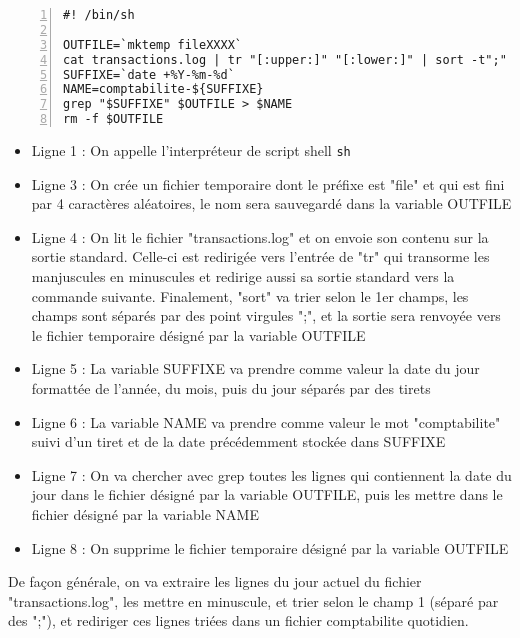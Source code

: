 \documentclass[11pt,a4paper]{article}
\begin{document}
\bigskip

\lstset{language=sh}
\begin{lstlisting}[frame=single,numbers=left,title={script.sh}]
#! /bin/sh

OUTFILE=`mktemp fileXXXX`
cat transactions.log | tr "[:upper:]" "[:lower:]" | sort -t";" -k1 -o $OUTFILE
SUFFIXE=`date +%Y-%m-%d`
NAME=comptabilite-${SUFFIXE}
grep "$SUFFIXE" $OUTFILE > $NAME
rm -f $OUTFILE

\end{lstlisting}

\bigskip

\begin{itemize}
\item Ligne 1 : On appelle l'interpréteur de script shell \texttt{sh}
\item Ligne 3 : On crée un fichier temporaire dont le préfixe est "file" et qui est fini par 4 caractères aléatoires, le nom sera sauvegardé dans la variable OUTFILE
\item Ligne 4 : On lit le fichier "transactions.log" et on envoie son contenu sur la sortie standard. Celle-ci est redirigée vers l'entrée de "tr" qui transorme les manjuscules en minuscules et redirige aussi sa sortie standard vers la commande suivante. Finalement, "sort" va trier selon le 1er champs, les champs sont séparés par des point virgules ";", et la sortie sera renvoyée vers le fichier temporaire désigné par la variable OUTFILE
\item Ligne 5 : La variable SUFFIXE va prendre comme valeur la date du jour formattée de l'année, du mois, puis du jour séparés par des tirets
\item Ligne 6 : La variable NAME va prendre comme valeur le mot "comptabilite" suivi d'un tiret et de la date précédemment stockée dans SUFFIXE
\item Ligne 7 : On va chercher avec grep toutes les lignes qui contiennent la date du jour dans le fichier désigné par la variable OUTFILE, puis les mettre dans le fichier désigné par la variable NAME
\item Ligne 8 : On supprime le fichier temporaire désigné par la variable OUTFILE
\end{itemize}

De façon générale, on va extraire les lignes du jour actuel du fichier "transactions.log", les mettre en minuscule, et trier selon le champ 1 (séparé par des ";"), et rediriger ces lignes triées dans un fichier comptabilite quotidien.\\
\end{document}
